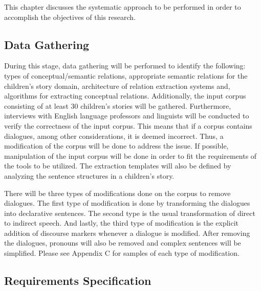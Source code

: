 %
%
%                 


This chapter discusses the systematic approach to be performed in order to accomplish the objectives of this research.

\subsection{Data Gathering}

During this stage, data gathering will be performed to identify the following: types of conceptual/semantic relations, appropriate semantic relations for the children's story domain, architecture of relation extraction systems and, algorithms for extracting conceptual relations. Additionally, the input corpus consisting of at least 30 children's stories will be gathered. Furthermore, interviews with English language professors and linguists will be conducted to verify the correctness of the input corpus. This means that if a corpus  contains dialogues, among other considerations, it is deemed incorrect. Thus, a modification of the corpus will be done to address the issue. If possible, manipulation of the input corpus will be done in order to fit the requirements of the tools to be utilized. The extraction templates will also be defined by analyzing the sentence structures in a children's story.  

There will be three types of modifications done on the corpus to remove dialogues. The first type of modification is done by transforming the dialogues into declarative sentences. The second type is the usual transformation of direct to indirect speech. And lastly, the third type of modification is the explicit addition of discourse markers whenever a dialogue is modified. After removing the dialogues, pronouns will also be removed and complex sentences will be simplified. Please see Appendix C for samples of each type of modification.

\subsection{Requirements Specification}

